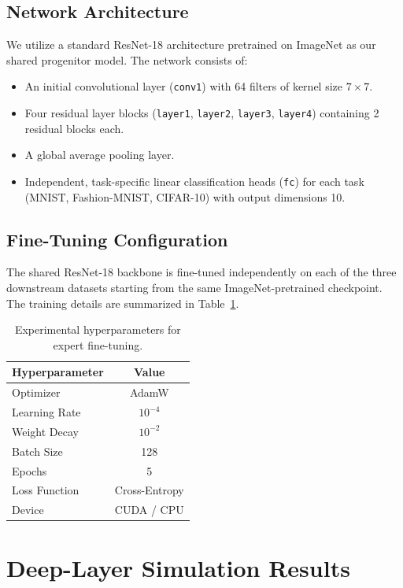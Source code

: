 \documentclass{article}
\theoremstyle{plain}
\theoremstyle{definition}
\theoremstyle{remark}
\begin{document}
\subsection{Network Architecture}
We utilize a standard ResNet-18 architecture \cite{he16} pretrained on ImageNet as our shared progenitor model. The network consists of:
\begin{itemize}
  \item An initial convolutional layer (\texttt{conv1}) with 64 filters of kernel size $7\times7$.
  \item Four residual layer blocks (\texttt{layer1}, \texttt{layer2}, \texttt{layer3}, \texttt{layer4}) containing 2 residual blocks each.
  \item A global average pooling layer.
  \item Independent, task-specific linear classification heads (\texttt{fc}) for each task (MNIST, Fashion-MNIST, CIFAR-10) with output dimensions 10.
\end{itemize}

\subsection{Fine-Tuning Configuration}
The shared ResNet-18 backbone is fine-tuned independently on each of the three downstream datasets starting from the same ImageNet-pretrained checkpoint. The training details are summarized in Table~\ref{tab:hyperparams}.

\begin{table}[h]
  \caption{Experimental hyperparameters for expert fine-tuning.}
  \label{tab:hyperparams}
  \centering
  \begin{tabular}{lc}
    \toprule
    \textbf{Hyperparameter} & \textbf{Value} \\
    \midrule
    Optimizer & AdamW \\
    Learning Rate & $10^{-4}$ \\
    Weight Decay & $10^{-2}$ \\
    Batch Size & 128 \\
    Epochs & 5 \\
    Loss Function & Cross-Entropy \\
    Device & CUDA / CPU \\
    \bottomrule
  \end{tabular}
\end{table}

\section{Deep-Layer Simulation Results}
\label{app:deep_sim}
\end{document}
